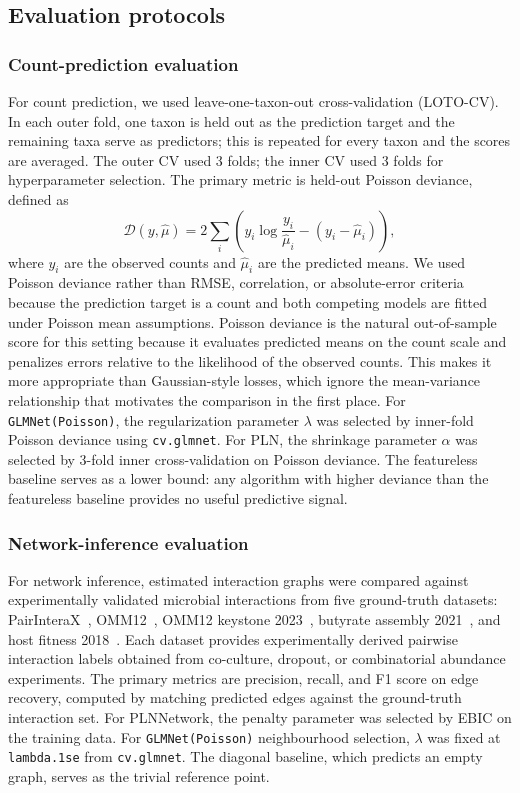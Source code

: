 \documentclass{jmlr}
\begin{document}
\subsection{Evaluation protocols}
\label{subsec:evaluation-protocols}

\subsubsection{Count-prediction evaluation}

For count prediction, we used leave-one-taxon-out cross-validation (LOTO-CV).
In each outer fold, one taxon is held out as the prediction target and the remaining taxa serve as predictors; this is repeated for every taxon and the scores are averaged.
The outer CV used 3 folds; the inner CV used 3 folds for hyperparameter selection.
The primary metric is held-out Poisson deviance, defined as
\[
  \mathcal{D}(y, \hat\mu) = 2\sum_{i} \left( y_i \log\frac{y_i}{\hat\mu_i} - (y_i - \hat\mu_i) \right),
\]
where $y_i$ are the observed counts and $\hat\mu_i$ are the predicted means.
We used Poisson deviance rather than RMSE, correlation, or absolute-error criteria because the prediction target is a count and both competing models are fitted under Poisson mean assumptions.
Poisson deviance is the natural out-of-sample score for this setting because it evaluates predicted means on the count scale and penalizes errors relative to the likelihood of the observed counts.
This makes it more appropriate than Gaussian-style losses, which ignore the mean-variance relationship that motivates the comparison in the first place.
For \texttt{GLMNet(Poisson)}, the regularization parameter $\lambda$ was selected by inner-fold Poisson deviance using \texttt{cv.glmnet}.
For PLN, the shrinkage parameter $\alpha$ was selected by 3-fold inner cross-validation on Poisson deviance.
The featureless baseline serves as a lower bound: any algorithm with higher deviance than the featureless baseline provides no useful predictive signal.

\subsubsection{Network-inference evaluation}

For network inference, estimated interaction graphs were compared against experimentally validated microbial interactions from five ground-truth datasets: PairInteraX~\cite{Zhu2025PairInteraX}, OMM12~\cite{Weiss2022OMM12}, OMM12 keystone 2023~\cite{Weiss2023Keystone}, butyrate assembly 2021~\cite{Clark2021Butyrate}, and host fitness 2018~\cite{Gould2018HostFitness}.
Each dataset provides experimentally derived pairwise interaction labels obtained from co-culture, dropout, or combinatorial abundance experiments.
The primary metrics are precision, recall, and F1 score on edge recovery, computed by matching predicted edges against the ground-truth interaction set.
For PLNNetwork, the penalty parameter was selected by EBIC on the training data.
For \texttt{GLMNet(Poisson)} neighbourhood selection, $\lambda$ was fixed at \texttt{lambda.1se} from \texttt{cv.glmnet}.
The diagonal baseline, which predicts an empty graph, serves as the trivial reference point.
\end{document}
